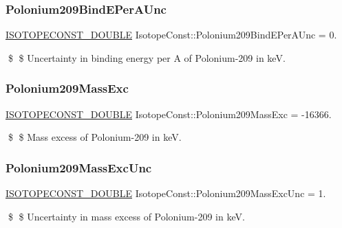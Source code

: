\subsubsection{\texorpdfstring{Polonium209\+Bind\+E\+Per\+A\+Unc}{Polonium209BindEPerAUnc}}
{\footnotesize\ttfamily \mbox{\hyperlink{group___isotope_const-_macros_ga8f45a7272ce02c0b4c65c44636ed719a}{I\+S\+O\+T\+O\+P\+E\+C\+O\+N\+S\+T\+\_\+\+D\+O\+U\+B\+LE}} Isotope\+Const\+::\+Polonium209\+Bind\+E\+Per\+A\+Unc = 0.}

\$ \$ Uncertainty in binding energy per A of Polonium-\/209 in keV. \mbox{\label{group___isotope_const-_polonium-_po209_ga66cf2b55e8038bdcaec3bc8b139f0771}} 
\subsubsection{\texorpdfstring{Polonium209\+Mass\+Exc}{Polonium209MassExc}}
{\footnotesize\ttfamily \mbox{\hyperlink{group___isotope_const-_macros_ga8f45a7272ce02c0b4c65c44636ed719a}{I\+S\+O\+T\+O\+P\+E\+C\+O\+N\+S\+T\+\_\+\+D\+O\+U\+B\+LE}} Isotope\+Const\+::\+Polonium209\+Mass\+Exc = -\/16366.}

\$ \$ Mass excess of Polonium-\/209 in keV. \mbox{\label{group___isotope_const-_polonium-_po209_ga9a73deecffa12bc5d112640e71c1b5f3}} 
\subsubsection{\texorpdfstring{Polonium209\+Mass\+Exc\+Unc}{Polonium209MassExcUnc}}
{\footnotesize\ttfamily \mbox{\hyperlink{group___isotope_const-_macros_ga8f45a7272ce02c0b4c65c44636ed719a}{I\+S\+O\+T\+O\+P\+E\+C\+O\+N\+S\+T\+\_\+\+D\+O\+U\+B\+LE}} Isotope\+Const\+::\+Polonium209\+Mass\+Exc\+Unc = 1.}

\$ \$ Uncertainty in mass excess of Polonium-\/209 in keV. \mbox{\label{group___isotope_const-_polonium-_po209_gaec34ff4a76f834576a14ca414b57b2f1}} 
